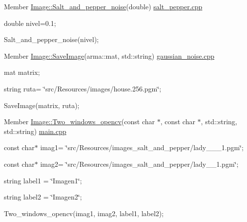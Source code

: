 \label{test__test000011}
\hypertarget{test__test000011}{}
 
\begin{DoxyDescription}
\item[Member \hyperlink{classImage_a05c18284cc5906a249ca055e35f98037}{Image::Salt\_\-and\_\-pepper\_\-noise}(double) ]\hyperlink{salt__pepper_8cpp}{salt\_\-pepper.cpp} \par
 double nivel=0.1; \par
 Salt\_\-and\_\-pepper\_\-noise(nivel); 
\end{DoxyDescription}

\label{test__test000013}
\hypertarget{test__test000013}{}
 
\begin{DoxyDescription}
\item[Member \hyperlink{classImage_a3203c7c554c580a3c08755bb43d5b048}{Image::SaveImage}(arma::mat, std::string) ]\hyperlink{gaussian__noise_8cpp}{gaussian\_\-noise.cpp} \par
 mat matrix; \par
 string ruta= \char`\"{}src/Resources/images/house.256.pgm\char`\"{}; \par
 SaveImage(matrix, ruta); 
\end{DoxyDescription}

\label{test__test000021}
\hypertarget{test__test000021}{}
 
\begin{DoxyDescription}
\item[Member \hyperlink{classImage_ab88eac57a583bac4fe326477d33d57b0}{Image::Two\_\-windows\_\-opencv}(const char $\ast$, const char $\ast$, std::string, std::string) ]\hyperlink{main_8cpp}{main.cpp} \par
 const char$\ast$ imag1= \char`\"{}src/Resources/images\_\-salt\_\-and\_\-pepper/lady\_\_\_\-1.pgm\char`\"{}; \par
 const char$\ast$ imag2= \char`\"{}src/Resources/images\_\-salt\_\-and\_\-pepper/lady\_\_\-1.pgm\char`\"{}; \par
 string label1 = \char`\"{}Imagen1\char`\"{}; \par
 string label2 = \char`\"{}Imagen2\char`\"{}; \par
 Two\_\-windows\_\-opencv(imag1, imag2, label1, label2); 
\end{DoxyDescription}